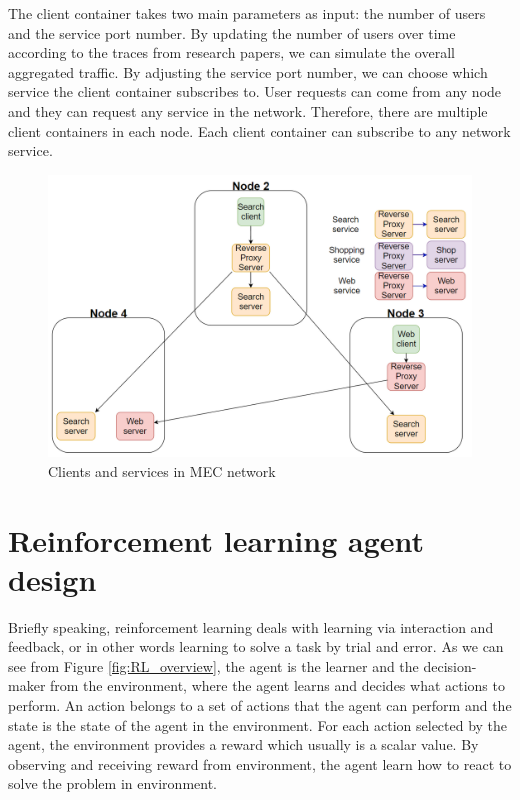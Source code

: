 \documentclass[conference]{IEEEtran}
\begin{document}
The client container takes two main parameters as input: the number of users and the service port number. By updating the number of users over time according to the traces from research papers, we can simulate the overall aggregated traffic. By adjusting the service port number, we can choose which service the client container subscribes to. User requests can come from any node and they can request any service in the network. Therefore, there are multiple client containers in each node. Each client container can subscribe to any network service. 

\begin{figure}[]
    \centering
    \includegraphics[scale = 0.3]{imgs/metro_network_env_client_services.png}
    \caption{Clients and services in MEC network}
    \label{fig:metro_network_env_client_services}
\end{figure}



\section{Reinforcement learning agent design}
\label{sec:RL_Agent}
Briefly speaking, reinforcement learning deals with learning via interaction and feedback, or in other words learning to solve a task by trial and error. As we can see from Figure \ref{fig:RL_overview}, the agent is the learner and the decision-maker from the environment, where the agent learns and decides what actions to perform. An action belongs to a set of actions that the agent can perform and the state is the state of the agent in the environment. For each action selected by the agent, the environment provides a reward which usually is a scalar value. By observing and receiving reward from environment, the agent learn how to react to solve the problem in environment. 
\end{document}
